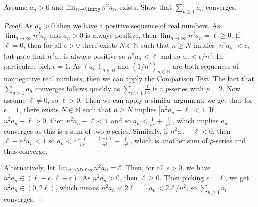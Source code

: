 \documentclass[oneside]{amsart}
\theoremstyle{definition}
\newcommand{\nn}{\mathbb N}
\begin{document}
\begin{tcolorbox}[colback=black!5!white,colframe=black!75!black,title= Exercise $4.2.$] Assume $a_n > 0$ and $\lim_{n \to \Infty}n^2a_n$ exists. Show that $\sum_{n \geq 1} a_n$ converges.
\tcblower 
\begin{proof} As $a_n > 0$ then we have a positive sequence of real numbers. As $\lim_{n \to \infty} n^2a_n$ and $a_n > 0$ is always positive, then $\lim_{n \to \infty} n^2 a_n = \ell \geq 0$. If $\ell = 0$, then for all $\epsilon > 0$ there exists $N \in \nn$ such that $n \geq N$ implies $|n^2a_n|<\epsilon$, but note that $n^2a_n$ is always positive so $n^2a_n < \ell$ and so $a_n < \epsilon/n^2$. In particular, pick $\epsilon = 1$. As $(a_n)_{n\in \nn}$ and $(1/n^2)_{n \in \nn}$ are both sequences of nonnegative real numbers, then we can apply the Comparison Test: The fact that $\sum_{n \geq 1}a_n$ converges follows quickly as $\sum_{n \geq 1} \frac{1}{n^2}$ is a $p$-series with $p=2$. Now assume $\ell \neq 0$, so $\ell > 0$. Then we can apply a similar argument: we get that for $\epsilon = 1$, there exists $N \in \nn$ such that $ n \geq N$ implies $|n^2a_n - \ell | < 1$. If $n^2a_n-\ell >0$, then $n^2a_n-\ell < 1$ and so $ a_n < \frac{1}{n^2} + \frac{\ell}{n^2}$, which implies $a_n$ converges as this is a sum of two $p$-series. Similarly, if $n^2a_n - \ell < 0$, then $\ell - n^2a_n < 1$ so $a_n < \frac{1-\ell}{-n^2} = \frac{(-1)}{n^2} +\frac{\ell}{n^2}$, which is another sum of $p$-series and thus converge. 

Alternatively, let $\lim_{n\to \Infty} n^2a_n = \ell $. Then, for all $\epsilon > 0$, we have $n^2a_n \in (\ell - \epsilon, \ell + \epsilon)$. As $n^2 a_n > 0$, then $\ell \geq 0$. Then picking $\epsilon = \ell$, we get $n^2a_n \in (0,2\ell)$, which means  $n^2 a_n < 2\ell \implies a_n < 2\ell/n^2 $, so $ \sum_{n \geq 1} a_n $ converges. 
\end{proof}
\end{tcolorbox}
\end{document}
